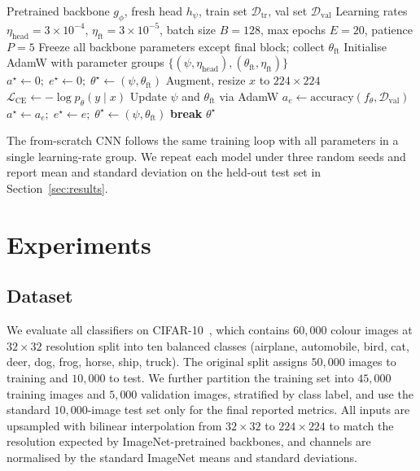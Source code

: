 \documentclass[10pt,twocolumn]{article}
\begin{document}
\begin{algorithm}[t]
\caption{Two-rate fine-tuning for CIFAR-10 transfer learning.}
\label{alg:training}
\begin{algorithmic}[1]
\Require Pretrained backbone $g_\phi$, fresh head $h_\psi$, train set $\mathcal{D}_{\text{tr}}$, val set $\mathcal{D}_{\text{val}}$
\Require Learning rates $\eta_{\text{head}} = 3 \times 10^{-4}$, $\eta_{\text{ft}} = 3 \times 10^{-5}$, batch size $B = 128$, max epochs $E = 20$, patience $P = 5$
\State Freeze all backbone parameters except final block; collect $\theta_{\text{ft}}$
\State Initialise AdamW with parameter groups $\{(\psi, \eta_{\text{head}}), (\theta_{\text{ft}}, \eta_{\text{ft}})\}$
\State $a^\star \gets 0;\; e^\star \gets 0;\; \theta^\star \gets (\psi, \theta_{\text{ft}})$
    \State Augment, resize $x$ to $224 \times 224$
    \State $\mathcal{L}_{\text{CE}} \gets -\log p_\theta(y \mid x)$
    \State Update $\psi$ and $\theta_{\text{ft}}$ via AdamW
  \EndFor
  \State $a_e \gets \mathrm{accuracy}(f_\theta, \mathcal{D}_{\text{val}})$
    \State $a^\star \gets a_e;\; e^\star \gets e;\; \theta^\star \gets (\psi, \theta_{\text{ft}})$
    \State \textbf{break}
  \EndIf
\EndFor
\State \Return $\theta^\star$
\end{algorithmic}
\end{algorithm}

The from-scratch CNN follows the same training loop with all parameters in a single learning-rate group. We repeat each model under three random seeds and report mean and standard deviation on the held-out test set in Section~\ref{sec:results}.


\section{Experiments}
\label{sec:experiments}

\subsection{Dataset}
\label{sec:exp:dataset}

We evaluate all classifiers on CIFAR-10~\cite{krizhevsky2009cifar}, which contains $60{,}000$ colour images at $32 \times 32$ resolution split into ten balanced classes (airplane, automobile, bird, cat, deer, dog, frog, horse, ship, truck). The original split assigns $50{,}000$ images to training and $10{,}000$ to test. We further partition the training set into $45{,}000$ training images and $5{,}000$ validation images, stratified by class label, and use the standard $10{,}000$-image test set only for the final reported metrics. All inputs are upsampled with bilinear interpolation from $32 \times 32$ to $224 \times 224$ to match the resolution expected by ImageNet-pretrained backbones, and channels are normalised by the standard ImageNet means and standard deviations.
\end{document}
